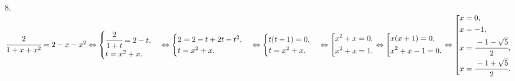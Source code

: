 8. $\cfrac{2}{1+x+x^2}=2-x-x^2 \Leftrightarrow \begin{cases}
\cfrac{2}{1+t}=2-t,\\
t=x^2+x.\end{cases}\Leftrightarrow\begin{cases}
2=2-t+2t-t^2,\\
t=x^2+x.\end{cases}\Leftrightarrow\begin{cases}
t(t-1)=0,\\
t=x^2+x.\end{cases}\Leftrightarrow \left[
\begin{gathered}
x^2+x=0, \hfill
\\
x^2+x=1. \hfill
\\
\end{gathered}
\right.\Leftrightarrow \left[
\begin{gathered}
x(x+1)=0, \hfill
\\
x^2+x-1=0. \hfill
\\
\end{gathered}
\right.\Leftrightarrow \left[
\begin{gathered}
x=0, \hfill
\\
x=-1, \hfill
\\
x=\cfrac{-1-\sqrt{5}}{2}, \hfill
\\
x=\cfrac{-1+\sqrt{5}}{2}. \hfill
\end{gathered}
\right.\hfill$\\
